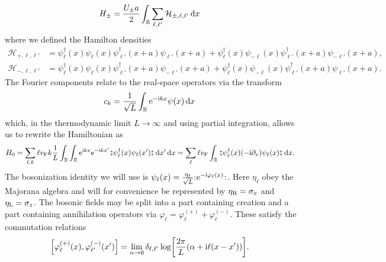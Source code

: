 \documentclass[english, parskip=full]{scrartcl}
\begin{document}
\begin{align}
H_\pm &= \frac{U_\pm a}{2} \int_{\mathbb{R}} \sum_{\ell,\ell'} \mathcal{H}_{\pm,\ell,\ell'} \, \mathrm{d}x
\end{align}
where we defined the Hamilton densities
\begin{align}
\mathcal{H}_{+,\ell,\ell'} &= \psi_{\ell}^\dagger(x) \psi_{\ell}(x) \psi_{\ell'}^\dagger(x+a) \psi_{\ell'}(x+a) + \psi_{\ell}^\dagger(x) \psi_{-\ell}(x) \psi_{\ell'}^\dagger(x+a) \psi_{-\ell'}(x+a),\\
\mathcal{H}_{-,\ell,\ell'} &= \psi_{\ell}^\dagger(x) \psi_{\ell}(x) \psi_{\ell'}^\dagger(x+a) \psi_{-\ell'}(x+a) + \psi_{\ell}^\dagger(x) \psi_{-\ell}(x) \psi_{\ell'}^\dagger(x+a) \psi_{\ell'}(x+a).
\end{align}
The Fourier components relate to the real-space operators via the transform
\begin{align}
c_k &= \frac{1}{\sqrt{L}} \int_{\mathbb{R}} \text{e}^{-\text{i} kx} \psi(x) \, \mathrm{d}x
\end{align}
which, in the thermodynamic limit $L\rightarrow\infty$ and using partial integration, allows us to rewrite the Hamiltonian as
\begin{align}
H_0 &= \sum_{\ell,k} \ell \vf k  \frac{1}{L}\intr{\intr{\powe{\i kx} \powe{-\i kx'} \varnormord{\psi_\ell^\dagger(x) \psi_\ell(x')}}{x'} }{x} = \sum_\ell \ell\vf \intr{ \varnormord{\psi_\ell^\dagger(x) (-\i\partial_x) \psi_\ell(x)} }{x}.
\end{align}
The bosonization identity we will use is $\psi_\ell(x) = \frac{\eta_\ell}{\sqrt{L}} {:\mathrel{\mspace{1mu}\text{e}^{-\text{i}\varphi_\ell(x)}\mspace{1mu}}:}$.
Here $\eta_\ell$ obey the Majorana algebra and will for convenience be represented by $\eta_{\text{R}} = \sigma_x$ and $\eta_{\text{L}} = \sigma_z$.
The bosonic fields may be split into a part containing creation and a part containing annihilation operators via $\varphi_\ell = \varphi_\ell^{(+)} + \varphi_\ell^{(-)}$.
These satisfy the commutation relations
\begin{align}
\klb*{\varphi_\ell^{(+)}(x), \varphi_{\ell'}^{(-)}(x')} &= \lim_{\alpha\rightarrow 0} \delta_{\ell,\ell'} \log\klb*{\frac{2\pi}{L} \kla*{\alpha + \i\ell(x-x')}}.
\end{align}
\end{document}

